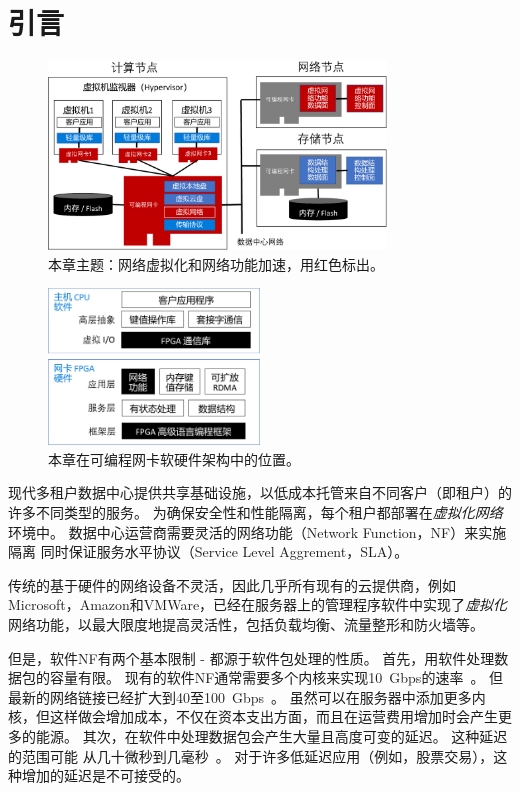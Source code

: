 \section{引言}



\begin{figure}[htbp]
	\centering
	\includegraphics[width=0.8\textwidth]{image/sys_arch.pdf}
	\caption{本章主题：网络虚拟化和网络功能加速，用红色标出。}
	\label{clicknp:fig:sys-arch}
\end{figure}

\begin{figure}[htbp]
	\centering
	\includegraphics[width=0.5\textwidth]{image/sw_hw_codesign.pdf}
	\caption{本章在可编程网卡软硬件架构中的位置。}
	\label{clicknp:fig:sw-hw-codesign}
\end{figure}

现代多租户数据中心提供共享基础设施，以低成本托管来自不同客户（即租户）的许多不同类型的服务。
为确保安全性和性能隔离，每个租户都部署在\textit{虚拟化网络}环境中。
数据中心运营商需要灵活的网络功能（Network Function，NF）来实施隔离
同时保证服务水平协议（Service Level Aggrement，SLA）。

传统的基于硬件的网络设备不灵活，因此几乎所有现有的云提供商，例如Microsoft，Amazon和VMWare，已经在服务器上的管理程序软件中实现了\textit{虚拟化}网络功能，以最大限度地提高灵活性，包括负载均衡、流量整形和防火墙等。

但是，软件NF有两个基本限制 - 都源于软件包处理的性质。
首先，用软件处理数据包的容量有限。
现有的软件NF通常需要多个内核来实现10~Gbps的速率~\cite{comb,martins2014clickos}。
但最新的网络链接已经扩大到40至100~Gbps~\cite{mellanox-100g}。
虽然可以在服务器中添加更多内核，但这样做会增加成本，不仅在资本支出方面，而且在运营费用增加时会产生更多的能源。
%
其次，在软件中处理数据包会产生大量且高度可变的延迟。 这种延迟的范围可能
从几十微秒到几毫秒~\cite{martins2014clickos,ananta,duet}。
对于许多低延迟应用（例如，股票交易），这种增加的延迟是不可接受的。

